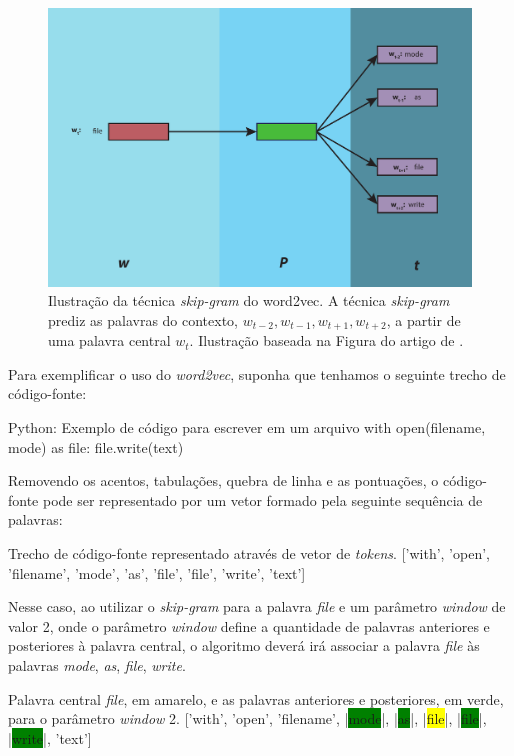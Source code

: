 \begin{figure}[H]
\centering
\includegraphics[width=.8\textwidth]{figuras/cap-trabalhos-relacionados/word2vec-skip-gram.pdf}
\caption{Ilustração da técnica \textit{skip-gram} do word2vec. A técnica \textit{skip-gram} prediz as palavras do contexto, $w_{t - 2}, w_{t - 1}, w_{t + 1}, w_{t + 2}$, a partir de uma palavra central $w_{t}$. Ilustração baseada na Figura do artigo de \cite{mikolov2013distributed}. } 
\label{fig:word2vec-skip-gram}
\end{figure}

Para exemplificar o uso do \textit{word2vec}, suponha que tenhamos o seguinte trecho de código-fonte:

\begin{mypython}{Python: Exemplo de código para escrever em um arquivo}
with open(filename, mode) as file:
    file.write(text)
\end{mypython}

Removendo os acentos, tabulações, quebra de linha e as pontuações, o código-fonte pode ser representado por um vetor formado pela seguinte sequência de palavras:

\begin{mypythonembedding}{Trecho de código-fonte representado através de vetor de \textit{tokens}.}
  ['with', 'open', 'filename', 'mode', 'as', 'file', 'file', 'write', 'text']
\end{mypythonembedding}

Nesse caso, ao utilizar o \textit{skip-gram} para a palavra \emph{file} e um parâmetro \textit{window} de valor 2, onde o parâmetro \textit{window} define a quantidade de palavras anteriores e posteriores à palavra central, o algoritmo deverá irá associar a palavra \textit{file} às palavras \emph{mode}, \emph{as}, \emph{file}, \emph{write}.

\begin{mypythonembedding}{Palavra central \textit{file}, em amarelo, e as palavras anteriores e posteriores, em verde, para o parâmetro \textit{window} 2.}
  ['with', 'open', 'filename', |\colorbox{green}{mode}|, |\colorbox{green}{as}|, |\colorbox{yellow}{file}|, |\colorbox{green}{file}|, |\colorbox{green}{write}|, 'text']
\end{mypythonembedding}

